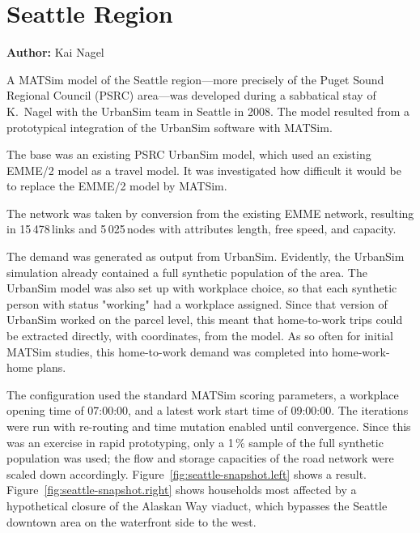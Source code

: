 \section{Seattle Region}
\label{sec:seattle}
\hfill \textbf{Author:} Kai Nagel

A MATSim model of the Seattle region---more precisely of the Puget Sound Regional Council (PSRC) area---was developed during a sabbatical stay of K.\ Nagel with the UrbanSim team in Seattle in 2008. The model resulted from a prototypical integration of the UrbanSim software \citep[e.g.,][]{WaddellEtc2003UrbanSim} with MATSim. 

The base was an existing PSRC UrbanSim model, which used an existing EMME/2 model 
as a travel model. It was investigated how difficult it would be to replace the EMME/2 model by MATSim. 

The network was taken by conversion from the existing EMME network, resulting in 15\,478\,links and 5\,025\,nodes with attributes length, free speed, and capacity.

The demand was generated as output from UrbanSim. Evidently, the UrbanSim simulation already contained a full synthetic population of the area. The UrbanSim model was also set up with workplace choice, so that each synthetic person with status "working" had a workplace assigned. Since that version of UrbanSim worked on the parcel level, this meant that home-to-work trips could be extracted directly, with coordinates, from the model. As so often for initial MATSim studies, this home-to-work demand was completed into home-work-home plans.

The configuration used the standard MATSim scoring parameters, a workplace opening time of 07:00:00, and a latest work start time of 09:00:00. The iterations were run with re-routing and time mutation enabled until convergence. Since this was an exercise in rapid prototyping, only a 1\,\% sample of the full synthetic population was used; the flow and storage capacities of the road network were scaled down accordingly. Figure~\ref{fig:seattle-snapshot.left} shows a result. Figure~\ref{fig:seattle-snapshot.right} shows households most affected by a hypothetical closure of the Alaskan Way viaduct, which bypasses the Seattle downtown area on the waterfront side to the west.

